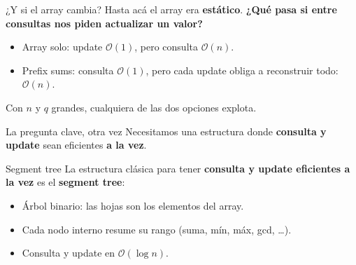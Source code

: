 \documentclass{beamer}
\begin{document}
\begin{frame}{¿Y si el array cambia?}
    Hasta acá el array era \textbf{estático}. \textbf{¿Qué pasa si entre
    consultas nos piden actualizar un valor?}
    \begin{itemize}
        \item Array solo: update $\mathcal{O}(1)$, pero consulta $\mathcal{O}(n)$.
        \item Prefix sums: consulta $\mathcal{O}(1)$, pero cada update obliga
              a reconstruir todo: $\mathcal{O}(n)$.
    \end{itemize}

    \vspace{0.2cm}
    Con $n$ y $q$ grandes, cualquiera de las dos opciones explota.

    \vspace{0.2cm}
    \begin{alertblock}{La pregunta clave, otra vez}
        Necesitamos una estructura donde \textbf{consulta y update} sean
        eficientes \textbf{a la vez}.
    \end{alertblock}
\end{frame}


\begin{frame}{Segment tree}
    La estructura clásica para tener \textbf{consulta y update eficientes a
    la vez} es el \textbf{segment tree}:
    \begin{itemize}
        \item Árbol binario: las hojas son los elementos del array.
        \item Cada nodo interno resume su rango (suma, mín, máx, gcd, \ldots).
        \item Consulta y update en $\mathcal{O}(\log n)$.
    \end{itemize}
    \begin{center}
    \end{center}
\end{frame}
\end{document}
